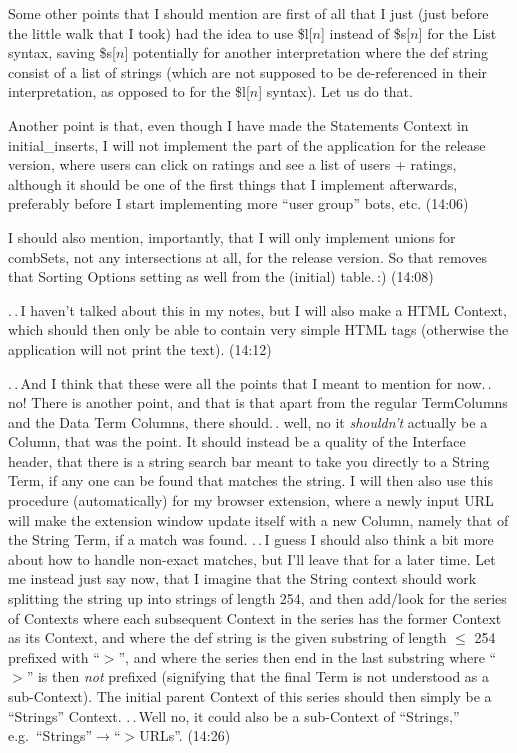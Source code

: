 \documentclass{report}
\begin{document}
Some other points that I should mention are first of all that I just (just before the little walk that I took) had the idea to use \$l[$n$] instead of \$s[$n$] for the List syntax, saving \$s[$n$] potentially for another interpretation where the def string consist of a list of strings (which are not supposed to be de-referenced in their interpretation, as opposed to for the \$l[$n$] syntax). Let us do that.

Another point is that, even though I have made the Statements Context in initial\_inserts, I will not implement the part of the application for the release version, where users can click on ratings and see a list of users + ratings, although it should be one of the first things that I implement afterwards, preferably before I start implementing more ``user group'' bots, etc. (14:06)

I should also mention, importantly, that I will only implement unions for combSets, not any intersections at all, for the release version. So that removes that Sorting Options setting as well from the (initial) table.\,:) (14:08)

.\,.\,I haven't talked about this in my notes, but I will also make a HTML Context, which should then only be able to contain very simple HTML tags (otherwise the application will not print the text). (14:12)

.\,.\,And I think that these were all the points that I meant to mention for now.\,. no! There is another point, and that is that apart from the regular TermColumns and the Data Term Columns, there should.\,. well, no it \emph{shouldn't} actually be a Column, that was the point. It should instead be a quality of the Interface header, that there is a string search bar meant to take you directly to a String Term, if any one can be found that matches the string. I will then also use this procedure (automatically) for my browser extension, where a newly input URL will make the extension window update itself with a new Column, namely that of the String Term, if a match was found. .\,.\,I guess I should also think a bit more about how to handle non-exact matches, but I'll leave that for a later time. Let me instead just say now, that I imagine that the String context should work splitting the string up into strings of length 254, and then add/look for the series of Contexts where each subsequent Context in the series has the former Context as its Context, and where the def string is the given substring of length $\leq$ 254 prefixed with ``$>$'', and where the series then end in the last substring where ``$>$'' is then \emph{not} prefixed (signifying that the final Term is not understood as a sub-Context). The initial parent Context of this series should then simply be a ``Strings'' Context. .\,.\,Well no, it could also be a sub-Context of ``Strings,'' e.g.\ ``Strings''$\rightarrow$``$>$URLs''. (14:26)
\end{document}
